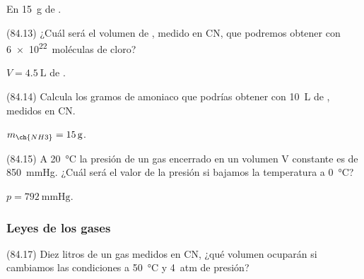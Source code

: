 \documentclass[10pt,a5paper,twoside]{article}
\begin{document}
      \begin{solution}
        En \SI{15}{g} de .
      \end{solution}




      \begin{exercise}[
          tags    = {},
          topics  = {química,química básica},
          source  = {FQ 1B MGH 2016, p84, e13},
        ]
        (84.13) ¿Cuál será el volumen de , medido en CN, que podremos
        obtener con \SI{6e22}{moléculas} de cloro?
      \end{exercise}

      \begin{solution}
        \( V = \SI{4.5}{\liter} \) de .
      \end{solution}




      \begin{exercise}[
          tags    = {},
          topics  = {química,química básica},
          source  = {FQ 1B MGH 2016, p84, e14},
        ]
        (84.14) Calcula los gramos de amoniaco que podrías obtener con \SI{10}{\liter}
        de , medidos en CN.
      \end{exercise}

      \begin{solution}
        \( m_{\ch{NH3}} = \SI{15}{g} \).
      \end{solution}




      \begin{exercise}[
          tags    = {},
          topics  = {química,química básica},
          source  = {FQ 1B MGH 2016, p84, e15},
        ]
        (84.15) A \SI{20}{\celsius} la presión de un gas encerrado en un volumen V constante es de \SI{850}{\mmHg}. ¿Cuál será el valor de la presión si bajamos la temperatura a \SI{0}{\celsius}?
      \end{exercise}

      \begin{solution}
        \( p = \SI{792}{\mmHg} \).
      \end{solution}



    \subsubsection*{Leyes de los gases}

      \begin{exercise}[
          tags    = {},
          topics  = {química,química básica},
          source  = {FQ 1B MGH 2016, p84, e17},
        ]
        (84.17) Diez litros de un gas medidos en CN, ¿qué volumen ocuparán
        si cambiamos las condiciones a \SI{50}{\celsius} y \SI{4}{atm} de presión?
      \end{exercise}
\end{document}
